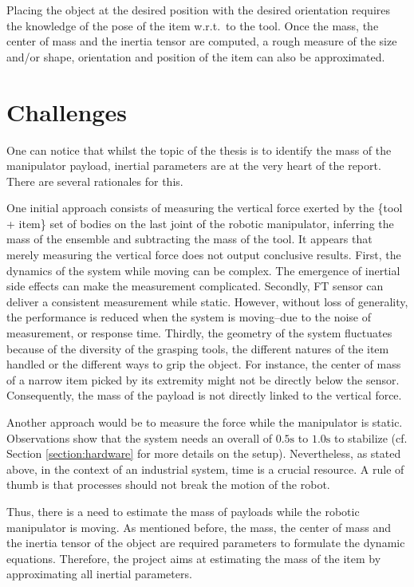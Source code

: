 \documentclass[/home/francois/latex/report/main.tex]{subfiles}
\begin{document}
Placing the object at the desired position with the desired orientation requires the knowledge of the pose of the item w.r.t.\ to the tool. Once the mass, the center of mass and the inertia tensor are computed, a rough measure of the size and/or shape, orientation and position of the item can also be approximated.

\section{Challenges}

One can notice that whilst the topic of the thesis is to identify the mass of the manipulator payload, inertial parameters are at the very heart of the report. There are several rationales for this.

One initial approach consists of measuring the vertical force exerted by the \{tool + item\} set of bodies on the last joint of the robotic manipulator, inferring the mass of the ensemble and subtracting the mass of the tool. It appears that merely measuring the vertical force does not output conclusive results. First, the dynamics of the system while moving can be complex. The emergence of inertial side effects can make the measurement complicated. Secondly, \ac{FT} sensor can deliver a consistent measurement while static. However, without loss of generality, the performance is reduced when the system is moving–due to the noise of measurement, or response time. Thirdly, the geometry of the system fluctuates because of the diversity of the grasping tools, the different natures of the item handled or the different ways to grip the object. For instance, the center of mass of a narrow item picked by its extremity might not be directly below the sensor. Consequently, the mass of the payload is not directly linked to the vertical force.

Another approach would be to measure the force while the manipulator is static. Observations show that the system needs an overall of $0.5 \si{\second}$ to $1.0 \si{\second}$ to stabilize (cf. Section \ref{section:hardware} for more details on the setup). Nevertheless, as stated above, in the context of an industrial system, time is a crucial resource. A rule of thumb is that processes should not break the motion of the robot.

Thus, there is a need to estimate the mass of payloads while the robotic manipulator is moving. As mentioned before, the mass, the center of mass and the inertia tensor of the object are required parameters to formulate the dynamic equations. Therefore, the project aims at estimating the mass of the item by approximating all inertial parameters.
\end{document}
